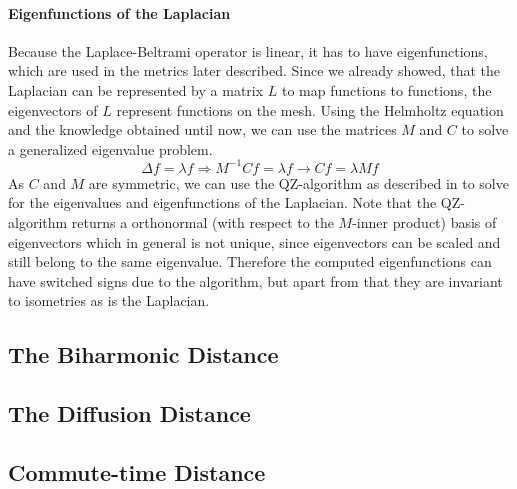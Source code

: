 \paragraph{Eigenfunctions of the Laplacian}
Because the Laplace-Beltrami operator is linear, it has to have eigenfunctions, which are used in the metrics later described.
Since we already showed, that the Laplacian can be represented by a matrix $L$ to map functions to functions, the eigenvectors of $L$ represent functions on the mesh.
Using the Helmholtz equation and the knowledge obtained until now, we can use the matrices $M$ and $C$ to solve a generalized eigenvalue problem.
\begin{equation}
	\Delta f = \lambda f \Rightarrow M^{-1}C f = \lambda f \rightarrow Cf = \lambda M f
	\label{eq:laplacian:eigenvalue}
\end{equation}
As $C$ and $M$ are symmetric, we can use the QZ-algorithm as described in \cite{moler1973algorithm} to solve for the eigenvalues and eigenfunctions of the Laplacian.
Note that the QZ-algorithm returns a orthonormal (with respect to the $M$-inner product) basis of eigenvectors which in general is not unique, since eigenvectors can be scaled and still belong to the same eigenvalue.
Therefore the computed eigenfunctions can have switched signs due to the algorithm, but apart from that they are invariant to isometries as is the Laplacian.

\subsection{The Biharmonic Distance}
\subsection{The Diffusion Distance}
\subsection{Commute-time Distance}
